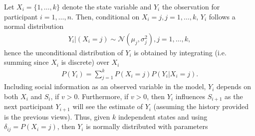 \documentclass[9pt,a4paper,twocolumn,lineno]{article}
\begin{document}
Let $X_i=\{1,\dots,k\}$ denote the state variable and $Y_i$ the observation for participant $i=1,\dots,n$. Then, conditional on $X_i=j, j=1,\dots,k$, $Y_i$ follows a normal distribution
\begin{align*}
	Y_i|(X_i=j)  \sim \mathcal{N} (\mu_j,\sigma^2_j), j=1,\dots,k,
\end{align*}
hence the unconditional distribution of $Y_i$ is obtained by integrating (i.e. summing since $X_i$ is discrete) over $X_i$
\begin{align*}
	P(Y_i) = \sum_{j=1}^k P(X_i=j)P(Y_i|X_i=j).
\end{align*}
Including social information as an observed variable in the model, $Y_i$ depends on both $X_i$ and $S_i$, if $v>0$. Furthermore, if $v>0$, then $Y_i$ influences $S_{i+1}$ as the next participant $Y_{i+1}$ will see the estimate of $Y_i$ (assuming the history provided is the previous views).
%
%
%
%
Thus, given $k$ independent states and using $\delta_{ij} = P(X_i=j)$, then $Y_i$ is normally distributed with parameters
\end{document}
